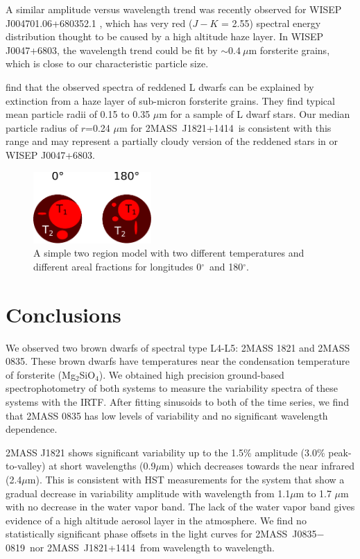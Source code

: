 \documentclass[twocolumn]{aastex6}
\newcommand{\degree}{$^\circ$}
\newcommand{\sha}{2MASS~J0835$-$0819}
\newcommand{\shb}{2MASS~J1821+1414}
\begin{document}
A similar amplitude versus wavelength trend was recently observed for WISEP J004701.06+680352.1 \citep{2016ApJ...829L..32L}, which has very red ($J-K$ = 2.55) spectral energy distribution thought to be caused by a high altitude haze layer.
In WISEP J0047+6803, the wavelength trend could be fit by $\sim0.4~\mu$m forsterite grains, which is close to our characteristic particle size.

\citet{hiranaka2016subMicronDust} find that the observed spectra of reddened L dwarfs can be explained by extinction from a haze layer of sub-micron forsterite grains.
They find typical mean particle radii of 0.15 to 0.35 $\mu$m for a sample of L dwarf stars.
Our median particle radius of $r$=0.24 $\mu$m for \shb\ is consistent with this range and may represent a partially cloudy version of the reddened stars in \citet{hiranaka2016subMicronDust} or WISEP J0047+6803.


\begin{figure}
\begin{centering}
\includegraphics[width=0.4\textwidth]{temperature_drawing.pdf}
\caption{A simple two region model with two different temperatures and different areal fractions for longitudes 0\degree\ and 180\degree.}\label{fig:tdiffschem}
\end{centering}
\end{figure}


\section{Conclusions}\label{sec:conclusions}

We observed two brown dwarfs of spectral type L4-L5: 2MASS 1821 and 2MASS 0835.
These brown dwarfs have temperatures near the condensation temperature of forsterite (Mg$_2$SiO$_4$).
We obtained high precision ground-based spectrophotometry of both systems to measure the variability spectra of these systems with the IRTF.
After fitting sinusoids to both of the time series, we find that 2MASS 0835 has low levels of variability and no significant wavelength dependence.

2MASS J1821 shows significant variability up to the 1.5\% amplitude (3.0\% peak-to-valley) at short wavelengths (0.9$\mu$m) which decreases towards the near infrared (2.4$\mu$m).
This is consistent with HST measurements for the system that show a gradual decrease in variability amplitude with wavelength \citep{2016ApJ...826....8Y} from 1.1$\mu$m to 1.7 $\mu$m with no decrease in the water vapor band.
The lack of the water vapor band gives evidence of a high altitude aerosol layer in the atmosphere.
We find no statistically significant phase offsets in the light curves for \sha\ nor \shb\ from wavelength to wavelength.
 
\end{document}
